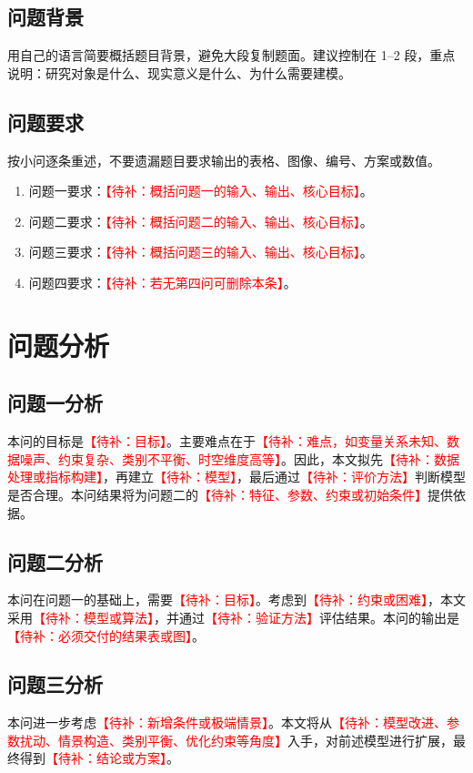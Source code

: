 \documentclass[UTF8,a4paper,zihao=5]{ctexart}
\numberwithin{equation}{section}
\numberwithin{figure}{section}
\numberwithin{table}{section}
\newcommand{\todo}[1]{\textcolor{red}{【待补：#1】}}
\begin{document}
\subsection{问题背景}
用自己的语言简要概括题目背景，避免大段复制题面。建议控制在 1--2 段，重点说明：研究对象是什么、现实意义是什么、为什么需要建模。

\subsection{问题要求}
按小问逐条重述，不要遗漏题目要求输出的表格、图像、编号、方案或数值。
\begin{enumerate}
  \item 问题一要求：\todo{概括问题一的输入、输出、核心目标}。
  \item 问题二要求：\todo{概括问题二的输入、输出、核心目标}。
  \item 问题三要求：\todo{概括问题三的输入、输出、核心目标}。
  \item 问题四要求：\todo{若无第四问可删除本条}。
\end{enumerate}

\section{问题分析}

\subsection{问题一分析}
本问的目标是\todo{目标}。主要难点在于\todo{难点，如变量关系未知、数据噪声、约束复杂、类别不平衡、时空维度高等}。因此，本文拟先\todo{数据处理或指标构建}，再建立\todo{模型}，最后通过\todo{评价方法}判断模型是否合理。本问结果将为问题二的\todo{特征、参数、约束或初始条件}提供依据。

\subsection{问题二分析}
本问在问题一的基础上，需要\todo{目标}。考虑到\todo{约束或困难}，本文采用\todo{模型或算法}，并通过\todo{验证方法}评估结果。本问的输出是\todo{必须交付的结果表或图}。

\subsection{问题三分析}
本问进一步考虑\todo{新增条件或极端情景}。本文将从\todo{模型改进、参数扰动、情景构造、类别平衡、优化约束等角度}入手，对前述模型进行扩展，最终得到\todo{结论或方案}。
\end{document}
